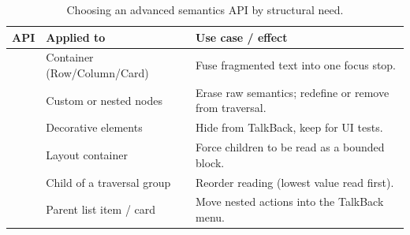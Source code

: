 \begin{table}[h]
	\centering
	\small
	\begin{tabularx}{\textwidth}{@{}l l Y@{}}
		\toprule
		\textbf{API}                       & \textbf{Applied to}         & \textbf{Use case / effect}                              \\
		\midrule
		     & Container (Row/Column/Card) & Fuse fragmented text into one focus stop.               \\
		   & Custom or nested nodes      & Erase raw semantics; redefine or remove from traversal. \\
		     & Decorative elements         & Hide from TalkBack, keep for UI tests.                  \\
		     & Layout container            & Force children to be read as a bounded block.           \\
		         & Child of a traversal group  & Reorder reading (lowest value read first).              \\
		 & Parent list item / card     & Move nested actions into the TalkBack menu.             \\
		\bottomrule
	\end{tabularx}
	\caption{Choosing an advanced semantics API by structural need.}
	\label{tab:matrix}
\end{table}
